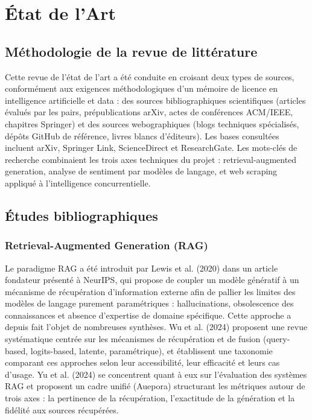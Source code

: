 \section{État de l'Art}

\subsection{Méthodologie de la revue de littérature}

Cette revue de l'état de l'art a été conduite en croisant deux types de sources, conformément aux exigences
méthodologiques d'un mémoire de licence en intelligence artificielle et data : des sources bibliographiques
scientifiques (articles évalués par les pairs, prépublications arXiv, actes de conférences ACM/IEEE,
chapitres Springer) et des sources webographiques (blogs techniques spécialisés, dépôts GitHub de
référence, livres blancs d'éditeurs). Les bases consultées incluent arXiv, Springer Link, ScienceDirect et
ResearchGate. Les mots-clés de recherche combinaient les trois axes techniques du projet : retrieval-augmented
generation, analyse de sentiment par modèles de langage, et web scraping appliqué à l'intelligence
concurrentielle.

\subsection{Études bibliographiques}

\subsubsection{Retrieval-Augmented Generation (RAG)}

Le paradigme RAG a été introduit par Lewis et al. (2020) \cite{lewis2020} dans un article fondateur présenté
à NeurIPS, qui propose de coupler un modèle génératif à un mécanisme de récupération d'information externe
afin de pallier les limites des modèles de langage purement paramétriques : hallucinations, obsolescence des
connaissances et absence d'expertise de domaine spécifique. Cette approche a depuis fait l'objet de
nombreuses synthèses. Wu et al. (2024) \cite{wu2024} proposent une revue systématique centrée sur les
mécanismes de récupération et de fusion (query-based, logits-based, latente, paramétrique), et établissent
une taxonomie comparant ces approches selon leur accessibilité, leur efficacité et leurs cas d'usage. Yu et
al. (2024) \cite{yu2024} se concentrent quant à eux sur l'évaluation des systèmes RAG et proposent un cadre
unifié (Auepora) structurant les métriques autour de trois axes : la pertinence de la récupération,
l'exactitude de la génération et la fidélité aux sources récupérées.

